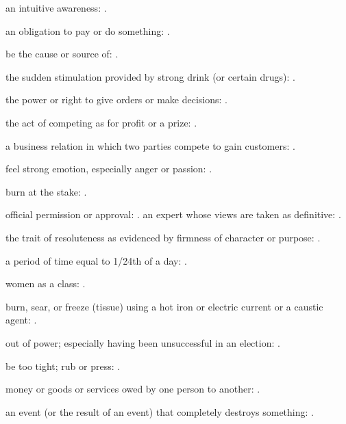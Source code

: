   an intuitive awareness: .

  an obligation to pay or do something: .

  be the cause or source of:   .

  the sudden stimulation provided by strong drink (or certain drugs): .

  the power or right to give orders or make decisions:   .

  the act of competing as for profit or a prize:   .

  a business relation in which two parties compete to gain customers: .

  feel strong emotion, especially anger or passion: .

  burn at the stake: .

  official permission or approval:   . an expert whose views are taken as definitive: .

  the trait of resoluteness as evidenced by firmness of character or purpose:   .

  a period of time equal to 1/24th of a day:   .

  women as a class:   .

  burn, sear, or freeze (tissue) using a hot iron or electric current or a caustic agent:   .

  out of power; especially having been unsuccessful in an election: .

  be too tight; rub or press:   .

  money or goods or services owed by one person to another: .

  an event (or the result of an event) that completely destroys something:   .

